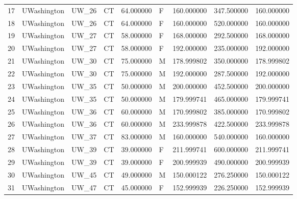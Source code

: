 \begin{tabular}{llllrlrrr}
17     &     UWashington &        UW\_26 &                 CT &  64.000000 &        F &       160.000000 &    347.500000 &  160.000000 \\
18     &     UWashington &        UW\_26 &                 CT &  64.000000 &        F &       160.000000 &    520.000000 &  160.000000 \\
19     &     UWashington &        UW\_27 &                 CT &  58.000000 &        F &       168.000000 &    292.500000 &  168.000000 \\
20     &     UWashington &        UW\_27 &                 CT &  58.000000 &        F &       192.000000 &    235.000000 &  192.000000 \\
21     &     UWashington &        UW\_30 &                 CT &  75.000000 &        M &       178.999802 &    350.000000 &  178.999802 \\
22     &     UWashington &        UW\_30 &                 CT &  75.000000 &        M &       192.000000 &    287.500000 &  192.000000 \\
23     &     UWashington &        UW\_35 &                 CT &  50.000000 &        M &       200.000000 &    452.500000 &  200.000000 \\
24     &     UWashington &        UW\_35 &                 CT &  50.000000 &        M &       179.999741 &    465.000000 &  179.999741 \\
25     &     UWashington &        UW\_36 &                 CT &  60.000000 &        M &       170.999802 &    385.000000 &  170.999802 \\
26     &     UWashington &        UW\_36 &                 CT &  60.000000 &        M &       233.999878 &    422.500000 &  233.999878 \\
27     &     UWashington &        UW\_37 &                 CT &  83.000000 &        M &       160.000000 &    540.000000 &  160.000000 \\
28     &     UWashington &        UW\_39 &                 CT &  39.000000 &        F &       211.999741 &    600.000000 &  211.999741 \\
29     &     UWashington &        UW\_39 &                 CT &  39.000000 &        F &       200.999939 &    490.000000 &  200.999939 \\
30     &     UWashington &        UW\_45 &                 CT &  49.000000 &        M &       150.000122 &    276.250000 &  150.000122 \\
31     &     UWashington &        UW\_47 &                 CT &  45.000000 &        F &       152.999939 &    226.250000 &  152.999939 \\

\end{tabular}
